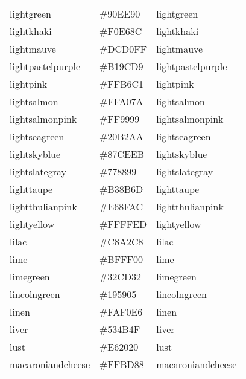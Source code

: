 \documentclass[
]{article}
\begin{document}
\begin{longtable}[]{@{}lll@{}}
lightgreen & \colorbox[rgb]{0.56,0.93,0.56}{\#90EE90} &
\textcolor[rgb]{0.56,0.93,0.56}{lightgreen            }\tabularnewline
lightkhaki & \colorbox[rgb]{0.94,0.9,0.55}{\#F0E68C} &
\textcolor[rgb]{0.94,0.9,0.55}{lightkhaki            }\tabularnewline
lightmauve & \colorbox[rgb]{0.86,0.82,1.0}{\#DCD0FF} &
\textcolor[rgb]{0.86,0.82,1.0}{lightmauve            }\tabularnewline
lightpastelpurple & \colorbox[rgb]{0.69,0.61,0.85}{\#B19CD9} &
\textcolor[rgb]{0.69,0.61,0.85}{lightpastelpurple     }\tabularnewline
lightpink & \colorbox[rgb]{1.0,0.71,0.76}{\#FFB6C1} &
\textcolor[rgb]{1.0,0.71,0.76}{lightpink             }\tabularnewline
lightsalmon & \colorbox[rgb]{1.0,0.63,0.48}{\#FFA07A} &
\textcolor[rgb]{1.0,0.63,0.48}{lightsalmon           }\tabularnewline
lightsalmonpink & \colorbox[rgb]{1.0,0.6,0.6}{\#FF9999} &
\textcolor[rgb]{1.0,0.6,0.6}{lightsalmonpink       }\tabularnewline
lightseagreen & \colorbox[rgb]{0.13,0.7,0.67}{\#20B2AA} &
\textcolor[rgb]{0.13,0.7,0.67}{lightseagreen         }\tabularnewline
lightskyblue & \colorbox[rgb]{0.53,0.81,0.98}{\#87CEEB} &
\textcolor[rgb]{0.53,0.81,0.98}{lightskyblue          }\tabularnewline
lightslategray & \colorbox[rgb]{0.47,0.53,0.6}{\#778899} &
\textcolor[rgb]{0.47,0.53,0.6}{lightslategray        }\tabularnewline
lighttaupe & \colorbox[rgb]{0.7,0.55,0.43}{\#B38B6D} &
\textcolor[rgb]{0.7,0.55,0.43}{lighttaupe            }\tabularnewline
lightthulianpink & \colorbox[rgb]{0.9,0.56,0.67}{\#E68FAC} &
\textcolor[rgb]{0.9,0.56,0.67}{lightthulianpink      }\tabularnewline
lightyellow & \colorbox[rgb]{1.0,1.0,0.88}{\#FFFFED} &
\textcolor[rgb]{1.0,1.0,0.88}{lightyellow           }\tabularnewline
lilac & \colorbox[rgb]{0.78,0.64,0.78}{\#C8A2C8} &
\textcolor[rgb]{0.78,0.64,0.78}{lilac                 }\tabularnewline
lime & \colorbox[rgb]{0.75,1.0,0.0}{\#BFFF00} &
\textcolor[rgb]{0.75,1.0,0.0}{lime                  }\tabularnewline
limegreen & \colorbox[rgb]{0.2,0.8,0.2}{\#32CD32} &
\textcolor[rgb]{0.2,0.8,0.2}{limegreen             }\tabularnewline
lincolngreen & \colorbox[rgb]{0.11,0.35,0.02}{\#195905} &
\textcolor[rgb]{0.11,0.35,0.02}{lincolngreen          }\tabularnewline
linen & \colorbox[rgb]{0.98,0.94,0.9}{\#FAF0E6} &
\textcolor[rgb]{0.98,0.94,0.9}{linen                 }\tabularnewline
liver & \colorbox[rgb]{0.33,0.29,0.31}{\#534B4F} &
\textcolor[rgb]{0.33,0.29,0.31}{liver                 }\tabularnewline
lust & \colorbox[rgb]{0.9,0.13,0.13}{\#E62020} &
\textcolor[rgb]{0.9,0.13,0.13}{lust                  }\tabularnewline
macaroniandcheese & \colorbox[rgb]{1.0,0.74,0.53}{\#FFBD88} &
\textcolor[rgb]{1.0,0.74,0.53}{macaroniandcheese     }\tabularnewline

\end{longtable}
\end{document}
